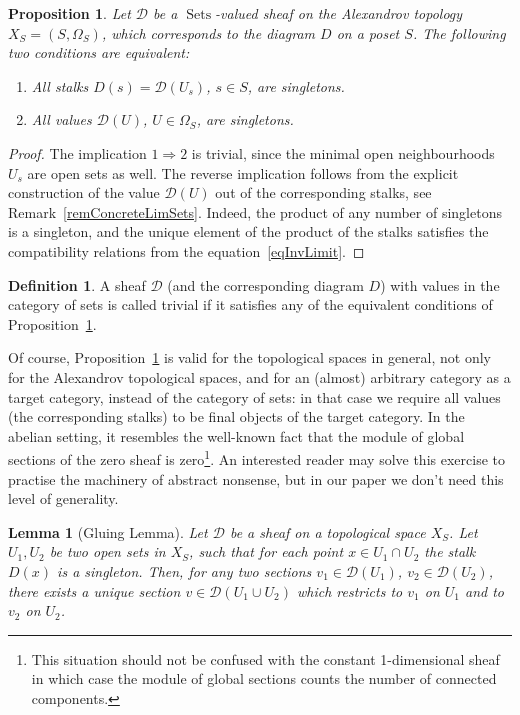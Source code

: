 \documentclass[english,12pt,oneside]{amsproc}
\DeclareMathOperator{\Sets}{Sets}
\newcommand{\ca}[1]{\mathcal{#1}}
\newcounter{stmcounter}[section]
\numberwithin{equation}{section}
\theoremstyle{plain}
\newtheorem{prop}[stmcounter]{Proposition}
\newtheorem{lem}[stmcounter]{Lemma}
\theoremstyle{definition}
\newtheorem{defin}[stmcounter]{Definition}
\theoremstyle{remark}
\begin{document}
\begin{prop}\label{propTrivialSheaf}
Let $\ca{D}$ be a $\Sets$-valued sheaf on the Alexandrov topology $X_S=(S,\Omega_S)$, which corresponds to the diagram $D$ on a poset $S$. The following two conditions are equivalent:
\begin{enumerate}
  \item All stalks $D(s)=\ca{D}(U_s)$, $s\in S$, are singletons.
  \item All values $\ca{D}(U)$, $U\in \Omega_S$, are singletons.
\end{enumerate}
\end{prop}

\begin{proof}
The implication $1\Rightarrow 2$ is trivial, since the minimal open neighbourhoods $U_s$ are open sets as well. The reverse implication follows from the explicit construction of the value $\ca{D}(U)$ out of the corresponding stalks, see Remark~\ref{remConcreteLimSets}. Indeed, the product of any number of singletons is a singleton,  and  the unique element of the product of the stalks satisfies the compatibility relations from the equation~\eqref{eqInvLimit}.
\end{proof}

\begin{defin}\label{defTrivialSheaf}
A sheaf $\ca{D}$ (and  the corresponding diagram $D$) with values in the category of sets is called trivial if it satisfies any of the equivalent conditions of Proposition~\ref{propTrivialSheaf}.
\end{defin}

Of course, Proposition~\ref{propTrivialSheaf} is valid for the topological spaces in general, not only for the Alexandrov topological spaces,  and  for an (almost) arbitrary category as a target category, instead of the category of sets: in that case we require all values (the corresponding stalks) to be final objects of the target category. In the abelian setting, it resembles the well-known fact that the module of global sections of the zero sheaf is zero\footnote{This situation should not be confused with the constant 1-dimensional sheaf in which case the module of global sections counts the number of connected components.}. An interested reader may solve this exercise to practise the machinery of abstract nonsense, but in our paper we don't need this level of generality.

\begin{lem}[Gluing Lemma]\label{lemGlue}
Let $\ca{D}$ be a sheaf on a topological space $X_S$. Let $U_1,U_2$ be two open sets in $X_S$, such that for each point $x\in U_1\cap U_2$ the stalk $D(x)$ is a singleton. Then, for any two sections $v_1\in \ca{D}(U_1)$, $v_2\in \ca{D}(U_2)$, there exists a unique section $v\in \ca{D}(U_1\cup U_2)$ which restricts to $v_1$ on $U_1$ and to $v_2$ on $U_2$.
\end{lem}
\end{document}
